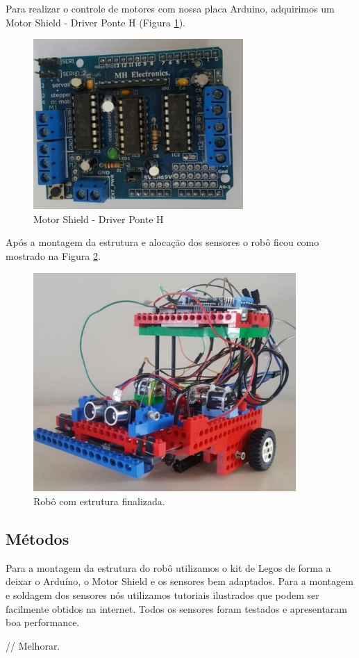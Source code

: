 \newpage

Para realizar o controle de motores com nossa placa Arduino, adquirimos um Motor Shield - Driver Ponte H (Figura \ref{shield}).

\begin{figure}[!htb]
	\centering
	\includegraphics[width=8cm]{images/shield.png}
	\caption{Motor Shield - Driver Ponte H}
	\label{shield}
\end{figure}

\newpage

Após a montagem da estrutura e alocação dos sensores o robô ficou como mostrado na Figura \ref{robo}. 

\begin{figure}[!htb]
	\centering
	\includegraphics[width=10cm]{images/robo.png}
	\caption{Robô com estrutura finalizada.}
	\label{robo}
\end{figure}


\subsection{Métodos}

Para a montagem da estrutura do robô utilizamos o kit de Legos de forma a deixar o Arduíno, o Motor Shield e os sensores bem adaptados. Para a montagem e soldagem dos sensores nós utilizamos tutoriais ilustrados que podem ser facilmente obtidos na internet. Todos os sensores foram testados e apresentaram boa performance.

// Melhorar.